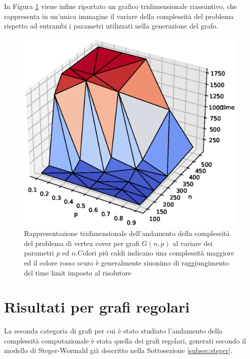In Figura \ref{fig:gnp3d} viene infine riportato un grafico tridimensionale riassuntivo, che rappresenta in un'unica immagine il variare della complessità del problema rispetto ad entrambi i parametri utilizzati nella generazione del grafo.
\vspace{-1cm}
\begin{figure}[h!]
     \centering
       \includegraphics[scale=0.5]{images/gnp-3d.eps}
       \vspace{-0.8cm}
       \caption{Rappresentazione tridimensionale dell'andamento della complessità del problema di vertex cover per grafi $G(n,p)$ al variare dei parametri $p$ ed $n$.Colori più caldi indicano una complessità maggiore ed il colore rosso scuro è generalmente sinonimo di raggiungimento del time limit imposto al risolutore}
        \label{fig:gnp3d}
\end{figure}


\section{Risultati per grafi regolari}
La seconda categoria di grafi per cui è stato studiato l'andamento della complessità computazionale è stata quella dei grafi regolari, generati secondo il modello di Steger-Wormald già descritto nella Sottosezione \ref{subsec:steger}.

